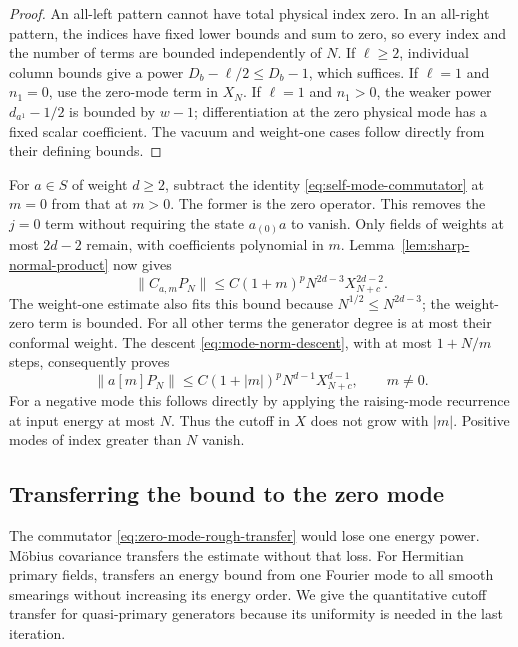 \begin{proof}
An all-left pattern cannot have total physical index zero.  In an
all-right pattern, the indices have fixed lower bounds and sum to
zero, so every index and the number of terms are bounded independently
of $N$.  If $\ell\geq2$, individual column bounds give a power
$D_b-\ell/2\leq D_b-1$, which suffices.  If $\ell=1$ and $n_1=0$,
use the zero-mode term in $X_N$.  If $\ell=1$ and $n_1>0$, the weaker
power $d_{a^1}-1/2$ is bounded by $w-1$; differentiation at the zero
physical mode has a fixed scalar coefficient.  The vacuum and
weight-one cases follow directly from their defining bounds.
\end{proof}

For $a\in S$ of weight $d\geq2$, subtract the identity
\eqref{eq:self-mode-commutator} at $m=0$ from that at $m>0$.  The
former is the zero operator.  This removes the $j=0$ term without
requiring the state $a_{(0)}a$ to vanish.  Only fields of weights at
most $2d-2$ remain, with coefficients polynomial in $m$.
Lemma~\ref{lem:sharp-normal-product} now gives
\begin{equation}\label{eq:sharp-commutator}
 \|C_{a,m}P_N\|
 \leq C(1+m)^p N^{2d-3}X_{N+c}^{2d-2}.
\end{equation}
The weight-one estimate also fits this bound because
$N^{1/2}\leq N^{2d-3}$; the weight-zero term is bounded.  For all
other terms the generator degree is at most their conformal weight.
The descent \eqref{eq:mode-norm-descent}, with at most $1+N/m$
steps, consequently proves
\begin{equation}\label{eq:sharp-nonzero-mode}
 \|a[m]P_N\|
 \leq C(1+|m|)^pN^{d-1}X_{N+c}^{d-1},
 \qquad m\ne0.
\end{equation}
For a negative mode this follows directly by applying the raising-mode
recurrence at input energy at most $N$.  Thus the cutoff in $X$ does
not grow with $|m|$.  Positive modes of index greater than $N$ vanish.

\subsection{Transferring the bound to the zero mode}

The commutator \eqref{eq:zero-mode-rough-transfer} would lose one energy
power.  Möbius covariance transfers the estimate without that loss.
For Hermitian primary fields, \cite[Proposition~3.1]{CTW} transfers
an energy bound from one Fourier mode to all smooth smearings without
increasing its energy order. We give the quantitative cutoff transfer
for quasi-primary generators because its uniformity is needed in the
last iteration.

